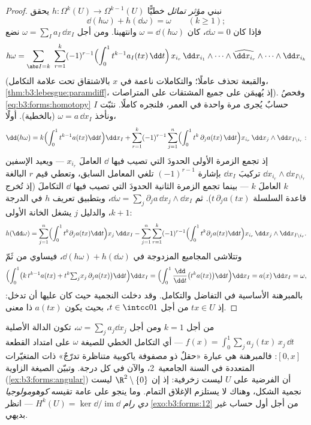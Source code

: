 \begin{proof}
نبني \emph{مؤثر تماثل} خطيًّا $h\colon
\Omega^k(U) \to \Omega^{k-1}(U)$ يحقق
\begin{equation}\label{eq:b3:forms:homotopy}
\dd(h\omega) + h(\dd\omega) = \omega
\qquad (k \geq 1);
\end{equation}
فإذا كان $\dd\omega = 0$، كان $\omega = \dd(h\omega)$ وانتهينا. ومن أجل $\omega = \sum_I a_I\,\dd x_I$
نضع
\[
h\omega = \sum_{\abs I = k}\ \sum_{r=1}^{k}(-1)^{r-1}
\Bigl(\int_0^1 t^{k-1}a_I(tx)\,\dd t\Bigr)\,
x_{i_r}\,\dd x_{i_1}\wedge\dots\wedge
\widehat{\dd x_{i_r}}\wedge\dots\wedge\dd x_{i_k}
\]
(والقبعة تحذف عاملًا؛ والتكاملات ناعمة في $x$ بالاشتقاق تحت
علامة التكامل، \cref{thm:b3:lebesgue:paramdiff}، إذ يُهيمَن على جميع المشتقات على
المتراصات). وفحصُ \eqref{eq:b3:forms:homotopy} حسابٌ يُجرى مرة واحدة في العمر،
فلنجره كاملًا. نثبّت $I$ ونأخذ $\omega =
a\,\dd x_I$ (بالخطية). أولًا،
\[
\dd(h\omega) = k\Bigl(\int_0^1t^{k-1}a(tx)\dd t\Bigr)\dd x_I
+ \sum_{r=1}^k(-1)^{r-1}\sum_{j=1}^n
\Bigl(\int_0^1t^{k}\,\partial_ja(tx)\,\dd t\Bigr)
x_{i_r}\,\dd x_j\wedge\dd x_{I\setminus i_r} :
\]
إذ تجمع الزمرة الأولى الحدودَ التي تصيب فيها $\dd$ العاملَ
$x_{i_r}$ --- ويعيد الإسفين $\dd x_{i_r}\wedge\dd
x_{I\setminus i_r}$ تركيبَ $\dd x_I$ بإشارة
$(-1)^{r-1}$ تلغي المعامل السابق، وتعطي قيم $r$ البالغة $k$
العاملَ $k$ --- بينما تجمع الزمرة الثانية الحدودَ التي تصيب
فيها $\dd$ التكاملَ (إذ تُخرج قاعدة السلسلة $t\,\partial_ja(tx)$). ثم
$\dd\omega =
\sum_j\partial_ja\,\dd x_j\wedge\dd x_I$، وبتطبيق تعريف $h$ في الدرجة $k+1$، والدليل $j$ يشغل
الخانة الأولى:
\[
h(\dd\omega) = \sum_{j=1}^n\Bigl(\int_0^1t^{k}
\partial_ja(tx)\dd t\Bigr)x_j\,\dd x_I
- \sum_{j=1}^n\sum_{r=1}^k(-1)^{r-1}
\Bigl(\int_0^1t^{k}\partial_ja(tx)\dd t\Bigr)
x_{i_r}\,\dd x_j\wedge\dd x_{I\setminus i_r} .
\]
وتتلاشى المجاميع المزدوجة في $\dd(h\omega) + h(\dd\omega)$، فيساوي من ثَمّ
\[
\Bigl(\int_0^1\bigl(k\,t^{k-1}a(tx) +
t^k{\textstyle\sum_j}x_j\,\partial_ja(tx)\bigr)\dd t\Bigr)
\dd x_I
= \Bigl(\int_0^1\frac{\dd}{\dd t}\bigl(t^ka(tx)\bigr)\dd
t\Bigr)\dd x_I
= a(x)\,\dd x_I = \omega,
\]
بالمبرهنة الأساسية في التفاضل والتكامل. وقد دخلت النجمية حيث
كان عليها أن تدخل: إذ $tx \in U$ من أجل $t \in \intcc01$، بحيث
يكون $a(tx)$ ذا معنى.
\end{proof}

\begin{remark}
من أجل $k = 1$ ومن أجل $\omega = \sum_j a_j\dd x_j$، تكون الدالة الأصلية $f(x) = \int_0^1\sum_ja_j(tx)\,x_j\,\dd t$ ---
أي التكامل الخطي للصيغة $\omega$ على امتداد القطعة $[0, x]$:
فالمبرهنة هي عبارة «حقلٌ ذو مصفوفة ياكوبية متناظرة تدرّجٌ» ذات
المتغيّرات المتعددة في السنة الجامعية~2، والآن في كل درجة.
وتبيّن الصيغة الزاوية (\cref{ex:b3:forms:angular}) أن الفرضية على $U$ ليست
زخرفية: إذ إن $\R^2\setminus\{0\}$ ليست نجمية الشكل، وهناك لا يستلزم الإغلاق
التمام. وما ينجو على  عامة تقيسه \emph{كوهومولوجيا
دي رام} $H^k(U) =
\ker\dd/\operatorname{im}\dd$ --- انظر \cref{exo:b3:forms:12} من أجل أول حساب غير بديهي.
\end{remark}

